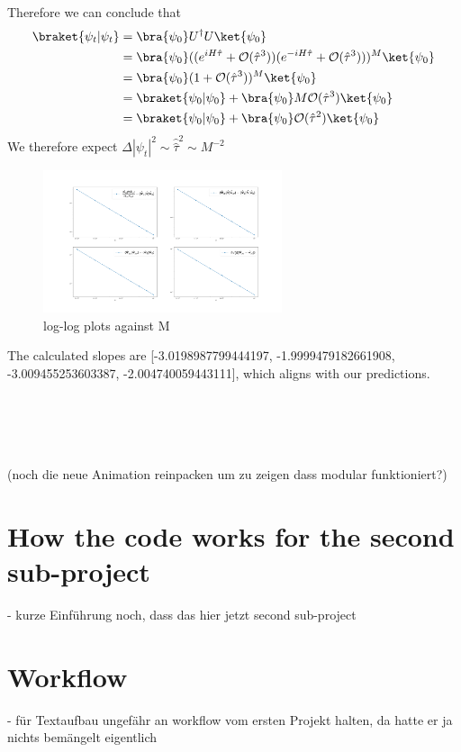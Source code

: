 \documentclass[11pt, letterpaper, onecolumn]{article}
\begin{document}
Therefore we can conclude that
\begin{align*}
    \braket{\psi_t|\psi_t}&=\bra{\psi_0}U^\dagger U\ket{\psi_0}\\
    &=\bra{\psi_0}((e^{iH\hat{\tau}}+\mathcal{O}(\hat{\tau}^3))(e^{-iH\hat{\tau}}+\mathcal{O}(\hat{\tau}^3)))^M\ket{\psi_0}\\
    &=\bra{\psi_0}(1+\mathcal{O}(\hat{\tau}^3))^M\ket{\psi_0}\\
    &=\braket{\psi_0|\psi_0}+\bra{\psi_0}M\mathcal{O}(\hat{\tau}^3)\ket{\psi_0}\\
    &=\braket{\psi_0|\psi_0}+\bra{\psi_0}\mathcal{O}(\hat{\tau}^2)\ket{\psi_0}
\end{align*}
We therefore expect $\Delta|\psi_t|^2\sim\hat{\hat{\tau}}^2\sim M^{-2}$
	\begin{figure} [h] 
	\begin{center}
	\includegraphics[width=7cm]{"final_loglog_1.png"}
	\caption{log-log plots against M}
	\end{center}
	\end{figure}
	The calculated slopes are [-3.0198987799444197, -1.9999479182661908, -3.009455253603387, -2.004740059443111], which aligns with our predictions.
	

	\\
 	\\
  	\\
   	\\
 	(noch die neue Animation reinpacken um zu zeigen dass modular funktioniert?)




	\newpage
   
	\section{How the code works for the second sub-project}	
	- kurze Einführung noch, dass das hier jetzt second sub-project
	
	
	
	\section{Workflow}
	- für Textaufbau ungefähr an workflow vom ersten Projekt halten, da hatte er ja nichts bemängelt eigentlich
	
\end{document}
